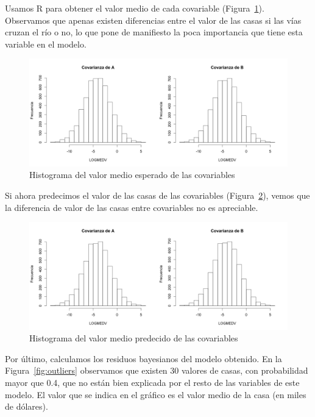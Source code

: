 \documentclass[12pt,a4paper,twoside,openright,titlepage,final]{article}
\begin{document}
Usamos R para obtener el valor medio de cada covariable (Figura~\ref{fig:esperado}). Observamos que apenas existen diferencias entre el valor de las casas si las vías cruzan el río o no, lo que pone de manifiesto la poca importancia que tiene esta variable en el modelo.\\

\begin{figure}[tbph!]
\centering
\includegraphics[width=0.9\linewidth]{imagenes/esperado}
\caption{Histograma del valor medio esperado de las covariables}
\label{fig:esperado}
\end{figure}

Si ahora predecimos el valor de las casas de las covariables (Figura~\ref{fig:predecido}), vemos que la diferencia de valor de las casas entre covariables no es apreciable.\\

\begin{figure}[tbph!]
\centering
\includegraphics[width=0.9\linewidth]{imagenes/predecido}
\caption{Histograma del valor medio predecido de las covariables}
\label{fig:predecido}
\end{figure}

Por último, calculamos los residuos bayesianos del modelo obtenido. En la Figura~\ref{fig:outliers} observamos que existen 30 valores de casas, con probabilidad mayor que 0.4, que no están bien explicada por el resto de las variables de este modelo. El valor que se indica en el gráfico es el valor medio de la casa (en miles de dólares).\\
\end{document}
